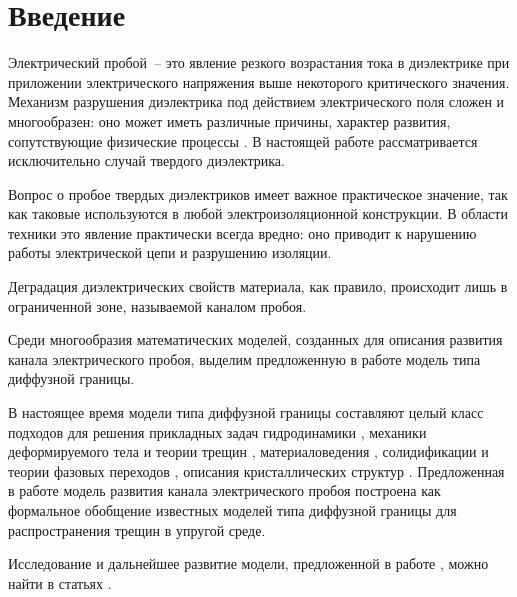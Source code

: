 
\section{Введение}

Электрический пробой~-- это явление резкого возрастания тока в диэлектрике при приложении электрического напряжения выше некоторого критического значения. Механизм разрушения диэлектрика под действием электрического поля сложен и многообразен: оно может иметь различные причины, характер развития, сопутствующие физические процессы \cite{vorobiev_dielectric_physics}. В настоящей работе рассматривается исключительно случай твердого диэлектрика.

Вопрос о пробое твердых диэлектриков имеет важное практическое значение, так как таковые используются в любой электроизоляционной конструкции. В области техники это явление практически всегда вредно: оно приводит к нарушению работы электрической цепи и разрушению изоляции.

Деградация диэлектрических свойств материала, как правило, происходит лишь в ограниченной зоне, называемой каналом пробоя.

Среди многообразия математических моделей, созданных для описания развития канала электрического пробоя, выделим предложенную в работе \cite{pitike_dielectric_breakdown} модель типа диффузной границы.

В настоящее время модели типа диффузной границы составляют целый класс подходов для решения прикладных задач гидродинамики \cite{lamorgese_flow_modeling, kim_fluid_flows, xu_hydrodynamics}, механики деформируемого тела и теории трещин \cite{ambati_fracture}, материаловедения \cite{provatas_materials}, солидификации и теории фазовых переходов \cite{boettinger_solidification, cartalade_phase_separation, gransaly_solidification}, описания кристаллических структур \cite{emmerich_crystal, asadi_crystal, provatas_crystal}. Предложенная в работе \cite{pitike_dielectric_breakdown} модель развития канала электрического пробоя построена как формальное обобщение известных моделей типа диффузной границы для распространения трещин в упругой среде.

Исследование и дальнейшее развитие модели, предложенной в работе \cite{pitike_dielectric_breakdown}, можно найти в статьях \cite{zipunova_higher_codimension, zipunova_conservative, zipunova_thermomechanical}.

